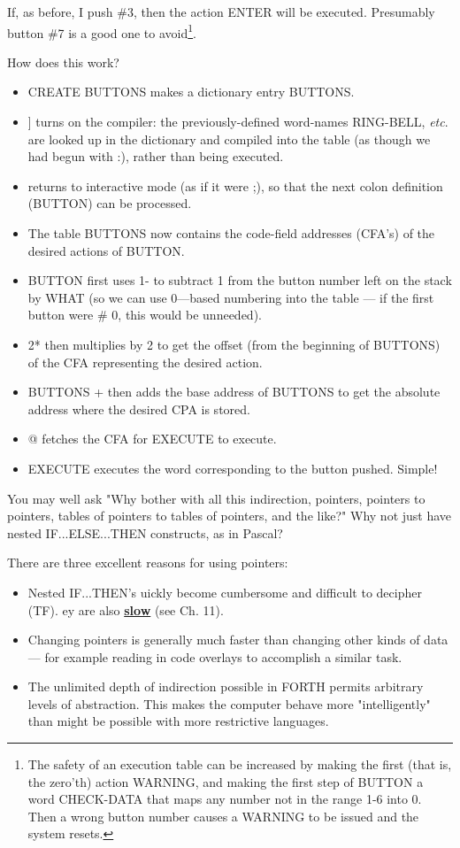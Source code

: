 If, as before, I push \#3, then the action ENTER will be executed. Presumably button \#7 is a good one to avoid\footnote{The safety of an execution table can be increased by making the first (that is, the zero’th) action WARNING, and making the first step of BUTTON a word CHECK-DATA that maps any number not in the range 1-6 into 0. Then a wrong button number causes a WARNING to be issued and the system resets.}.

How does this work?
\begin{itemize}
    \item CREATE BUTTONS makes a dictionary entry BUTTONS.
    \item ] turns on the compiler: the previously-defined word-names RING-BELL, \textit{etc}. are looked up in the dictionary and compiled into the table (as though we had begun with :), rather than being executed.
    \item \rbrack returns to interactive mode (as if it were ;), so that the next colon definition (BUTTON) can be processed.
    \item The table BUTTONS now contains the code-field addresses (CFA’s) of the desired actions of BUTTON.
    \item BUTTON first uses 1- to subtract 1 from the button number left on the stack by WHAT (so we can use 0—based numbering into the table — if the first button were \# 0, this would be unneeded).
    \item 2* then multiplies by 2 to get the offset (from the beginning of BUTTONS) of the CFA representing the desired action.
    \item BUTTONS + then adds the base address of BUTTONS to get the absolute address where the desired CPA is stored.
    \item @ fetches the CFA for EXECUTE to execute.
    \item EXECUTE executes the word corresponding to the button pushed. Simple!
\end{itemize}

You may well ask "Why bother with all this indirection, pointers, pointers to pointers, tables of pointers to tables of pointers, and the like?" Why not just have nested IF...ELSE...THEN constructs, as in Pascal?

There are three excellent reasons for using pointers:
\begin{itemize}
    \item Nested IF...THEN’s uickly become cumbersome and difficult to decipher (TF). ey are also \underline{\textbf{slow}} (see Ch. 11).
    \item Changing pointers is generally much faster than changing other kinds of data — for example reading in code overlays to accomplish a similar task.
    \item The unlimited depth of indirection possible in FORTH permits arbitrary levels of abstraction. This makes the computer behave more "intelligently" than might be possible with more restrictive languages.
\end{itemize}

